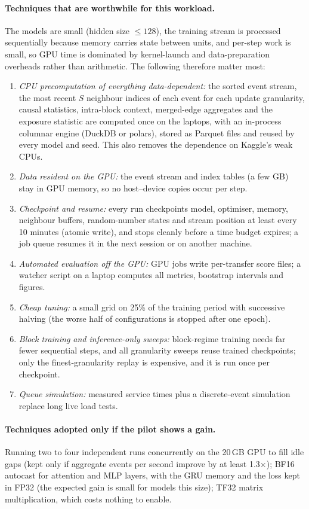 \documentclass[11pt,a4paper]{article}
\begin{document}
\paragraph{Techniques that are worthwhile for this workload.} The models are small (hidden size $\le128$), the training stream is processed sequentially because memory carries state between units, and per-step work is small, so GPU time is dominated by kernel-launch and data-preparation overheads rather than arithmetic. The following therefore matter most:
\begin{enumerate}[leftmargin=*]
    \item \textit{CPU precomputation of everything data-dependent:} the sorted event stream, the most recent $S$ neighbour indices of each event for each update granularity, causal statistics, intra-block context, merged-edge aggregates and the exposure statistic are computed once on the laptops, with an in-process columnar engine (DuckDB or polars), stored as Parquet files and reused by every model and seed. This also removes the dependence on Kaggle's weak CPUs.
    \item \textit{Data resident on the GPU:} the event stream and index tables (a few GB) stay in GPU memory, so no host--device copies occur per step.
    \item \textit{Checkpoint and resume:} every run checkpoints model, optimiser, memory, neighbour buffers, random-number states and stream position at least every 10 minutes (atomic write), and stops cleanly before a time budget expires; a job queue resumes it in the next session or on another machine.
    \item \textit{Automated evaluation off the GPU:} GPU jobs write per-transfer score files; a watcher script on a laptop computes all metrics, bootstrap intervals and figures.
    \item \textit{Cheap tuning:} a small grid on 25\% of the training period with successive halving (the worse half of configurations is stopped after one epoch).
    \item \textit{Block training and inference-only sweeps:} block-regime training needs far fewer sequential steps, and all granularity sweeps reuse trained checkpoints; only the finest-granularity replay is expensive, and it is run once per checkpoint.
    \item \textit{Queue simulation:} measured service times plus a discrete-event simulation replace long live load tests.
\end{enumerate}
\paragraph{Techniques adopted only if the pilot shows a gain.} Running two to four independent runs concurrently on the 20\,GB GPU to fill idle gaps (kept only if aggregate events per second improve by at least 1.3$\times$); BF16 autocast for attention and MLP layers, with the GRU memory and the loss kept in FP32 (the expected gain is small for models this size); TF32 matrix multiplication, which costs nothing to enable.
\end{document}
